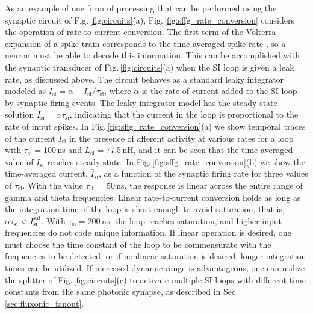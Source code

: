 \documentclass[twocolumn]{article}
\begin{document}
As an example of one form of processing that can be performed using the synaptic circuit of Fig.\,\ref{fig:circuits}(a), Fig.\,\ref{fig:sffg_rate_conversion} considers the operation of rate-to-current conversion. The first term of the Volterra expansion of a spike train corresponds to the time-averaged spike rate \cite{geki2002}, so a neuron must be able to decode this information. This can be accomplished with the synaptic transducer of Fig.\,\ref{fig:circuits}(a) when the SI loop is given a leak rate, as discussed above. The circuit behaves as a standard leaky integrator modeled as $\dot{I}_{\mathrm{si}} = \alpha-I_{\mathrm{si}}/\tau_{\mathrm{si}}$, where $\alpha$ is the rate of current added to the SI loop by synaptic firing events. The leaky integrator model has the steady-state solution $I_{\mathrm{si}} = \alpha \tau_{\mathrm{si}}$, indicating that the current in the loop is proportional to the rate of input spikes. In Fig.\,\ref{fig:sffg_rate_conversion}(a) we show temporal traces of the current $I_{\mathrm{si}}$ in the presence of afferent activity at various rates for a loop with $\tau_{\mathrm{si}} = $100\,ns and $L_{\mathrm{si}} = $77.5\,nH, and it can be seen that the time-averaged value of $I_{\mathrm{si}}$ reaches steady-state. In Fig.\,\ref{fig:sffg_rate_conversion}(b) we show the time-averaged current, $\bar{I}_{\mathrm{si}}$, as a function of the synaptic firing rate for three values of $\tau_{\mathrm{si}}$. With the value $\tau_{\mathrm{si}} =$\,50\,ns, the response is linear across the entire range of gamma and theta frequencies. Linear rate-to-current conversion holds as long as the integration time of the loop is short enough to avoid saturation, that is, $\alpha \tau_{\mathrm{si}} < I_{\mathrm{si}}^{\mathrm{sat}}$. With $\tau_{\mathrm{si}} = 200$\,ns, the loop reaches saturation, and higher input frequencies do not code unique information. If linear operation is desired, one must choose the time constant of the loop to be commensurate with the frequencies to be detected, or if nonlinear saturation is desired, longer integration times can be utilized. If increased dynamic range is advantageous, one can utilize the splitter of Fig.\,\ref{fig:circuits}(c) to activate multiple SI loops with different time constants from the same photonic synapse, as described in Sec.\,\ref{sec:fluxonic_fanout}.
\end{document}
